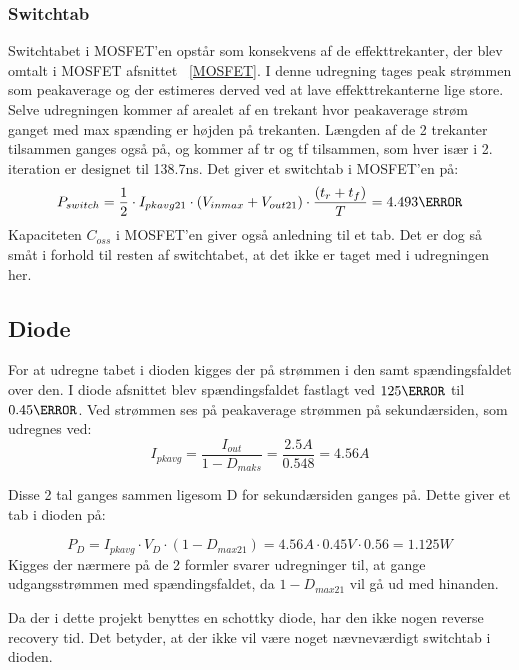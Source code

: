 \subsubsection{Switchtab} \label{switchtab2}
Switchtabet i MOSFET'en opstår som konsekvens af de effekttrekanter, der blev omtalt i MOSFET afsnittet ~\ref{MOSFET}. I denne udregning tages peak strømmen som peakaverage og der estimeres derved ved at lave effekttrekanterne lige store. Selve udregningen kommer af arealet af en trekant hvor peakaverage strøm ganget med max spænding er højden på trekanten. Længden af de 2 trekanter tilsammen ganges også på, og kommer af tr og tf tilsammen, som hver især i 2. iteration er designet til 138.7ns. Det giver et switchtab i MOSFET'en på:
 \begin{equation} \label{P_switch}
 P_{switch} = \frac{1}{2} \cdot I_{pkavg21} \cdot (V_{inmax}+V_{out21}) \cdot \frac{(t_r+t_f)}{T}= 4.493\watt
 \end{equation} 
Kapaciteten $C_{oss}$ i MOSFET'en giver også anledning til et tab. Det er dog så småt i forhold til resten af switchtabet, at det ikke er taget med i udregningen her. 

\subsection{Diode}
For at udregne tabet i dioden kigges der på strømmen i den samt spændingsfaldet over den. I diode afsnittet blev spændingsfaldet fastlagt ved $125\degreeCelsius$ til $0.45\ohm$. Ved strømmen ses på peakaverage strømmen på sekundærsiden, som udregnes ved:
\begin{equation} \label{I_pk_avg}
I_{pkavg} = \frac{I_{out}}{1-D_{maks}} = \frac{2.5A}{0.548} = 4.56A
\end{equation}

Disse 2 tal ganges sammen ligesom D for sekundærsiden ganges på. Dette giver et tab i dioden på:

\begin{equation} \label{diodetab}
P_D = I_{pkavg} \cdot V_D \cdot (1-D_{max21}) = 4.56A \cdot 0.45V \cdot 0.56 = 1.125W 
\end{equation}  
Kigges der nærmere på de 2 formler svarer udregninger til, at gange udgangsstrømmen med spændingsfaldet, da $1-D_{max21}$ vil gå ud med hinanden.

Da der i dette projekt benyttes en schottky diode, har den ikke nogen reverse recovery tid. Det betyder, at der ikke vil være noget nævneværdigt switchtab i dioden. 

